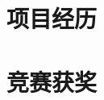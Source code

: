 \documentclass{resume}
\begin{document}





\section{\faFlask\ 项目经历}

\section{\faTrophy\ 竞赛获奖}


\end{document}
